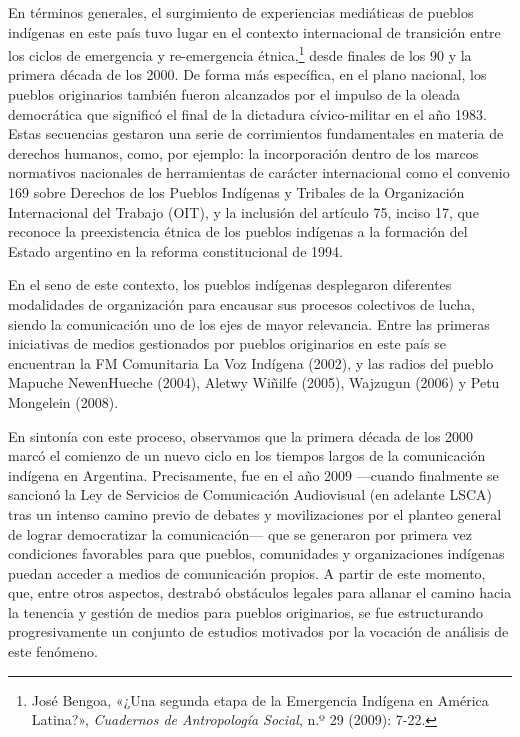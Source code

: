 \documentclass{tufte-handout}
\begin{document}
En términos generales, el surgimiento de experiencias mediáticas de
pueblos indígenas en este país tuvo lugar en el contexto internacional
de transición entre los ciclos de emergencia y re-emergencia
étnica,\footnote{José Bengoa, «¿Una segunda etapa de la Emergencia
  Indígena en América Latina?», \emph{Cuadernos de Antropología Social},
  n.º 29 (2009): 7-22.} desde finales de los 90 y la primera década de
los 2000. De forma más específica, en el plano nacional, los pueblos
originarios también fueron alcanzados por el impulso de la oleada
democrática que significó el final de la dictadura cívico-militar en el
año 1983. Estas secuencias gestaron una serie de corrimientos
fundamentales en materia de derechos humanos, como, por ejemplo: la
incorporación dentro de los marcos normativos nacionales de herramientas
de carácter internacional como el convenio 169 sobre Derechos de los
Pueblos Indígenas y Tribales de la Organización Internacional del
Trabajo (OIT), y la inclusión del artículo 75, inciso 17, que reconoce
la preexistencia étnica de los pueblos indígenas a la formación del
Estado argentino en la reforma constitucional de 1994.

En el seno de este contexto, los pueblos indígenas desplegaron
diferentes modalidades de organización para encausar sus procesos
colectivos de lucha, siendo la comunicación uno de los ejes de mayor
relevancia. Entre las primeras iniciativas de medios gestionados por
pueblos originarios en este país se encuentran la FM Comunitaria La Voz
Indígena (2002), y las radios del pueblo Mapuche NewenHueche (2004),
Aletwy Wiñilfe (2005), Wajzugun (2006) y Petu Mongelein (2008).

En sintonía con este proceso, observamos que la primera década de los
2000 marcó el comienzo de un nuevo ciclo en los tiempos largos de la
comunicación indígena en Argentina. Precisamente, fue en el año 2009
---cuando finalmente se sancionó la Ley de Servicios de Comunicación
Audiovisual (en adelante LSCA) tras un intenso camino previo de debates
y movilizaciones por el planteo general de lograr democratizar la
comunicación--- que se generaron por primera vez condiciones favorables
para que pueblos, comunidades y organizaciones indígenas puedan acceder
a medios de comunicación propios. A partir de este momento, que, entre
otros aspectos, destrabó obstáculos legales para allanar el camino hacia
la tenencia y gestión de medios para pueblos originarios, se fue
estructurando progresivamente un conjunto de estudios motivados por la
vocación de análisis de este fenómeno.
\end{document}
